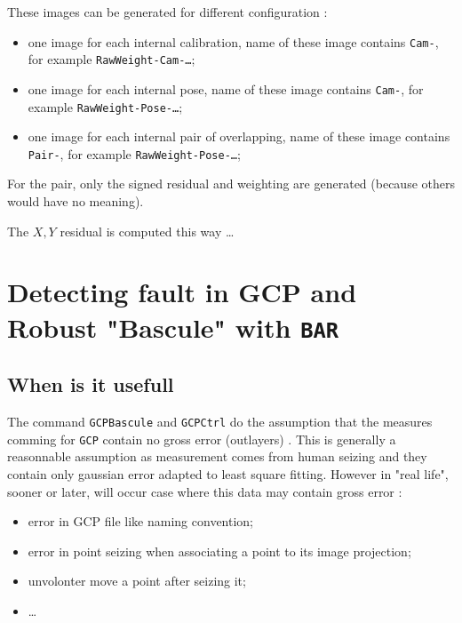 These images can be generated for  different configuration :

\begin{itemize}
   \item one image for each internal calibration, name of these image contains {\tt Cam-},
         for example {\tt  RawWeight-Cam-\dots};

   \item one image for each internal pose, name of these image contains {\tt Cam-},
         for example {\tt  RawWeight-Pose-\dots};

   \item one image for each internal pair of overlapping, name of these image contains {\tt Pair-},
         for example {\tt  RawWeight-Pose-\dots};
\end{itemize}

For the pair, only the signed residual and weighting are generated (because others
would have no meaning).

The $X,Y$ residual is computed this way \dots 


\section{Detecting fault in GCP and  Robust "Bascule"  with {\tt BAR}}
\label{Sec:BAR}

\subsection{When is it usefull}

The command {\tt GCPBascule} and {\tt GCPCtrl} do the assumption that the 
measures comming for {\tt GCP} contain no gross error (outlayers) .
This is generally a reasonnable assumption as measurement comes from human seizing and they contain only
gaussian error adapted to least square fitting. However in "real life", sooner or later, will occur case
where this data may contain gross error :

\begin{itemize}
  \item error in GCP file like naming convention;
  \item error in point seizing when associating a point to its image projection;
  \item unvolonter move a point after seizing it;
  \item  \dots
\end{itemize}


